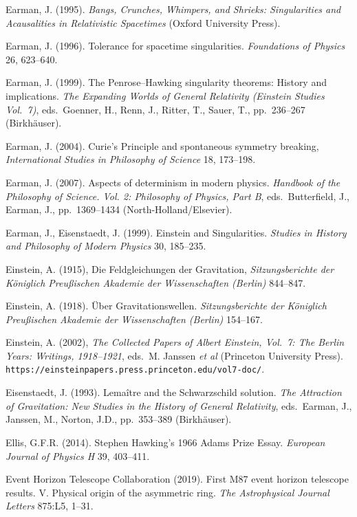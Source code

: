 \documentclass[12pt]{article}
\begin{document}
\begin{small}
\begin{thebibliography}{99}
\item[]  Earman, J. (1995).  \emph{Bangs, Crunches, Whimpers, and Shrieks: Singularities and Acausalities in Relativistic Spacetimes} (Oxford University Press).
\item[]  Earman, J. (1996). Tolerance for spacetime singularities. \emph{Foundations of Physics} 26, 623--640.
\item[] Earman, J. (1999). The Penrose--Hawking singularity theorems: History and implications. \emph{The Expanding Worlds of General Relativity (Einstein Studies Vol.\ 7)}, eds.\ Goenner, H., Renn, J., Ritter, T., Sauer, T., pp.\ 236--267
(Birkh\"{a}user). 
\item[]  Earman, J. (2004). Curie's Principle and spontaneous symmetry breaking, \emph{International Studies in  Philosophy of Science} 18, 173--198. 
\item[]  Earman, J. (2007). Aspects of determinism in modern physics.  \emph{Handbook of
the Philosophy of Science. Vol. 2: Philosophy of Physics, Part B}, eds.\   Butterfield, J., Earman, J.,
 pp.\ 1369--1434 (North-Holland/Elsevier).
\item[] Earman, J.,  Eisenstaedt, J. (1999). Einstein and Singularities. \emph{Studies in History and Philosophy of Modern Physics} 30, 185--235.
\item[] Einstein, A. (1915), Die Feldgleichungen der Gravitation,
\emph{Sitzungsberichte der K\"{o}niglich Preu\ss ischen Akademie der Wissenschaften (Berlin)} 844--847.
\item[] Einstein, A. (1918). \"{U}ber Gravitationswellen. \emph{Sitzungsberichte der K\"{o}niglich Preu\ss ischen Akademie der Wissenschaften (Berlin)} 154--167.
\item[] Einstein, A. (2002),   \emph{The Collected Papers of Albert Einstein, Vol.\ 7: The Berlin Years: Writings, 1918--1921},
eds.\ M. Janssen \emph{et al} (Princeton University Press). 
\\  \verb#https://einsteinpapers.press.princeton.edu/vol7-doc/#. 
\item[]  Eisenstaedt, J. (1993).  Lema\^{i}tre and the Schwarzschild solution.
\emph{The Attraction of Gravitation: New Studies in the History of General Relativity}, eds.\
Earman, J.,  Janssen, M.,  Norton, J.D., pp.\ 353--389  (Birkh\"{a}user). 
\item[]  Ellis, G.F.R. (2014). Stephen Hawking's 1966 Adams Prize Essay.  \emph{European Journal of Physics H} 
39, 403--411. 
        \item[] Event Horizon Telescope Collaboration (2019). First M87 event horizon telescope results. V. Physical origin of the asymmetric ring. \emph{The Astrophysical Journal Letters} 875:L5, 1--31.

\end{thebibliography}
\end{small}
\end{document}
